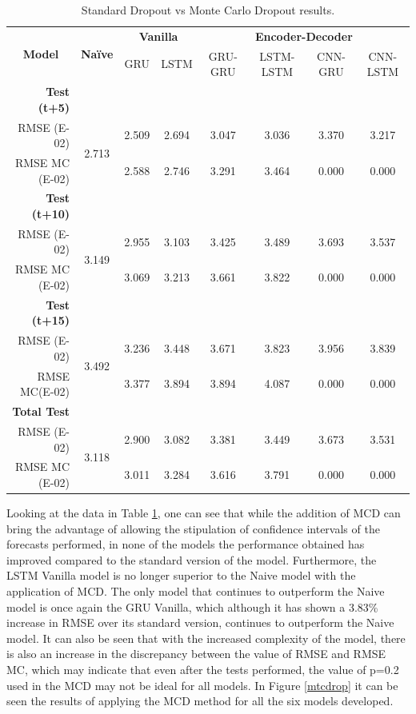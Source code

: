 \begin{table}[htbp]
  \centering
  \caption{Standard Dropout vs Monte Carlo Dropout results.}
    \begin{tabular}{r|c|cc|cccc}
    \multicolumn{1}{c|}{\multirow{2}[1]{*}{\textbf{Model}}} & \multirow{2}[1]{*}{\textbf{Naïve}} & \multicolumn{2}{c|}{\textbf{Vanilla}} & \multicolumn{4}{c}{\textbf{Encoder-Decoder}} \\
      &   & GRU & LSTM & GRU-GRU & LSTM-LSTM & CNN-GRU & CNN-LSTM \\
    \midrule
    \textbf{Test (t+5)} &   &   &   &   &   &   &  \\
    RMSE (E-02) & \multirow{2}[0]{*}{2.713} & 2.509 & 2.694 & 3.047 & 3.036 & 3.370 & 3.217 \\
    RMSE MC (E-02) &   & 2.588 & 2.746 & 3.291 & 3.464 & 0.000 & 0.000 \\
    \textbf{Test (t+10)} &   &   &   &   &   &   &  \\
    RMSE (E-02) & \multirow{2}[0]{*}{3.149} & 2.955 & 3.103 & 3.425 & 3.489 & 3.693 & 3.537 \\
    RMSE MC (E-02) &   & 3.069 & 3.213 & 3.661 & 3.822 & 0.000 & 0.000 \\
    \textbf{Test (t+15)} &   &   &   &   &   &   &  \\
    RMSE (E-02) & \multirow{2}[1]{*}{3.492} & 3.236 & 3.448 & 3.671 & 3.823 & 3.956 & 3.839 \\
    RMSE MC(E-02) &   & 3.377 & 3.894 & 3.894 & 4.087 & 0.000 & 0.000 \\
    \midrule
    \textbf{Total Test} &   &   &   &   &   &   &  \\
    RMSE (E-02) & \multirow{2}[0]{*}{3.118} & 2.900 & 3.082 & 3.381 & 3.449 & 3.673 & 3.531 \\
    RMSE MC (E-02) &   & 3.011 & 3.284 & 3.616 & 3.791 & 0.000 & 0.000 \\
    \end{tabular}%
  \label{tab:mctab}%
\end{table}%

Looking at the data in Table \ref{tab:mctab}, one can see that while the addition of \ac{MCD} can bring the advantage of allowing the stipulation of confidence intervals of the forecasts performed, in none of the models the performance obtained has improved compared to the standard version of the model. Furthermore, the \ac{LSTM} Vanilla model is no longer superior to the Naive model with the application of \ac{MCD}. The only model that continues to outperform the Naive model is once again the GRU Vanilla, which although it has shown a 3.83\% increase in \ac{RMSE} over its standard version, continues to outperform the Naive model. It can also be seen that with the increased complexity of the model, there is also an increase in the discrepancy between the value of RMSE and RMSE MC, which may indicate that even after the tests performed, the value of p=0.2 used in the MCD may not be ideal for all models. In Figure \ref{mtcdrop} it can be seen the results of applying the \ac{MCD} method for all the six models developed.

